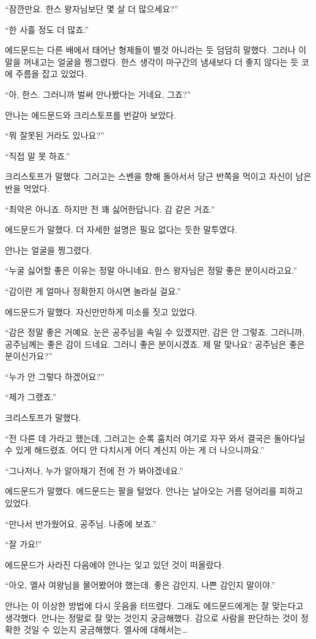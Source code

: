 ``잠깐만요. 한스 왕자님보단 몇 살 더 많으세요?''

``한 사흘 정도 더 많죠.''

에드문드는 다른 배에서 태어난 형제들이 별것 아니라는 듯 덤덤히 말했다. 그러나 이 말을 꺼내고는 얼굴을 찡그렸다. 한스 생각이 마구간의 냄새보다 더 좋지 않다는 듯 코에 주름을 잡고 있었다.

``아, 한스. 그러니까 벌써 만나봤다는 거네요, 그죠?''

안나는 에드문드와 크리스토프를 번갈아 보았다.

``뭐 잘못된 거라도 있나요?''

``직접 말 못 하죠.''

크리스토프가 말했다. 그러고는 스벤을 향해 돌아서서 당근 반쪽을 먹이고 자신이 남은 반을 먹었다.

``최악은 아니죠. 하지만 전 꽤 싫어한답니다. 감 같은 거죠.''

에드문드가 말했다. 더 자세한 설명은 필요 없다는 듯한 말투였다.

안나는 얼굴을 찡그렸다.

``누굴 싫어할 좋은 이유는 정말 아니네요. 한스 왕자님은 정말 좋은 분이시라고요.''

``감이란 게 얼마나 정확한지 아시면 놀라실 걸요.''

에드문드가 말했다. 자신만만하게 미소를 짓고 있었다.

``감은 정말 좋은 거예요. 눈은 공주님을 속일 수 있겠지만, 감은 안 그렇죠. 그러니까, 공주님께는 좋은 감이 드네요. 그러니 좋은 분이시겠죠. 제 말 맞나요? 공주님은 좋은 분이신가요?''

``누가 안 그렇다 하겠어요?''

``제가 그랬죠.''

크리스토프가 말했다.

``전 다른 데 가라고 했는데, 그러고는 순록 훔치러 여기로 자꾸 와서 결국은 돌아다닐 수 있게 해드렸죠. 어디 안 다치시게 어디 계신지 아는 게 더 나으니까요.''

``그나저나, 누가 알아채기 전에 전 가 봐야겠네요.''

에드문드가 말했다. 에드문드는 팔을 털었다. 안나는 날아오는 거름 덩어리를 피하고 있었다.

``만나서 반가웠어요, 공주님. 나중에 보죠.''

``잘 가요!''

에드문드가 사라진 다음에야 안나는 잊고 있던 것이 떠올랐다.

``아오, 엘사 여왕님을 물어봤어야 했는데. 좋은 감인지, 나쁜 감인지 말이야.''

안나는 이 이상한 방법에 다시 웃음을 터뜨렸다. 그래도 에드문드에게는 잘 맞는다고 생각했다. 안나는 정말로 잘 맞는 것인지 궁금해했다. 감으로 사람을 판단하는 것이 정확한 것일 수 있는지 궁금해했다. 엘사에 대해서는\ldots

